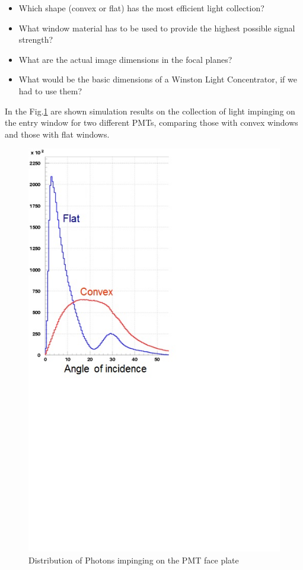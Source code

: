 \begin{itemize}
\item Which shape (convex or flat) has the most efficient light collection?
\item What window material has to be used to provide the highest possible signal strength?
\item What are the actual image dimensions in the focal planes?
\item What would be the basic dimensions of a Winston Light Concentrator, if we had to use them?
\end{itemize}

In the Fig.\ref{fig:Flat_Convex} are shown simulation results on the collection of light impinging on the entry window for two different PMTs, comparing those with convex windows and those with flat windows. 

\begin{figure}[!ht]
    \centering
    \includegraphics[width=1.0\linewidth,trim={0.0cm 9.1cm 6.3cm 0.1cm},clip]{images/Flat_Convex.jpg}
    \caption{Distribution of Photons impinging on the PMT face plate}
    \label{fig:Flat_Convex}
\end{figure}

